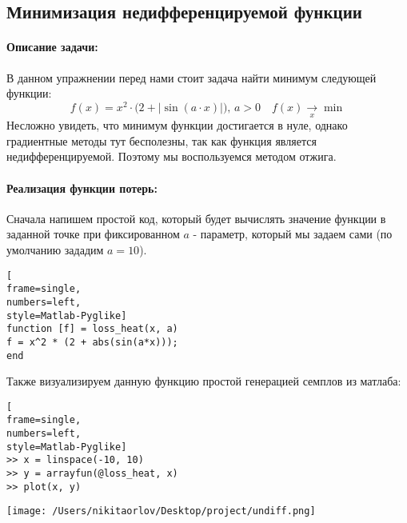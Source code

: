 \documentclass[12pt]{article}
\begin{document}
 \subsection{Минимизация недифференцируемой функции}
\paragraph{Описание задачи:}
В данном упражнении перед нами стоит задача найти минимум следующей функции:
\begin{equation*}
	f(x) = x^2 \cdot \big(2 + |\sin(a\cdot x)|\big), \, a >0 \quad f(x) \xrightarrow[x]{} \min
\end{equation*}
Несложно увидеть, что минимум функции достигается в нуле, однако градиентные методы тут бесполезны, так как функция является недифференцируемой. Поэтому мы воспользуемся методом отжига. 
\paragraph{Реализация функции потерь:}Сначала напишем простой код, который будет вычислять значение функции в заданной точке при фиксированном $a$ - параметр, который мы задаем сами (по умолчанию зададим $a = 10$).
\begin{lstlisting}[
frame=single,
numbers=left,
style=Matlab-Pyglike]
function [f] = loss_heat(x, a)
f = x^2 * (2 + abs(sin(a*x)));
end
\end{lstlisting}
Также визуализируем данную функцию простой генерацией семплов из матлаба:
\begin{lstlisting}[
frame=single,
numbers=left,
style=Matlab-Pyglike]
>> x = linspace(-10, 10)
>> y = arrayfun(@loss_heat, x)
>> plot(x, y)
\end{lstlisting}
\begin{center}
  		\texttt{[image: /Users/nikitaorlov/Desktop/project/undiff.png]}
\end{center}
\end{document}
